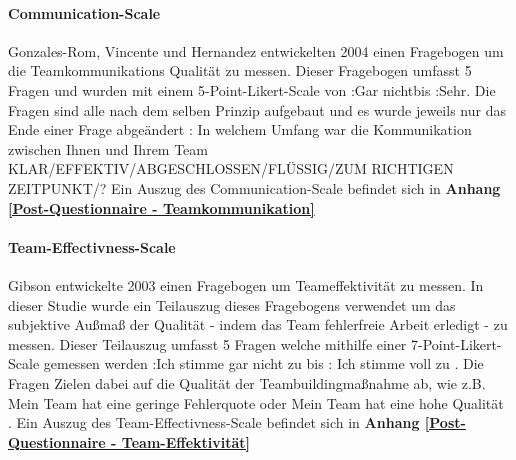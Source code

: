 \documentclass[a4paper,11pt]{article}%
\renewcommand{\\}{\vspace*{0.5\baselineskip} \newline}
\begin{document}
		\paragraph{Communication-Scale}
Gonzales-Rom, Vincente und Hernandez \citep[p.1049]{gonzalez2014climate}entwickelten 2004 einen Fragebogen um die Teamkommunikations Qualität zu messen. Dieser Fragebogen umfasst 5 Fragen und wurden mit einem 5-Point-Likert-Scale von :Gar nicht\frqq bis :Sehr\frqq. Die Fragen sind alle nach dem selben Prinzip aufgebaut und es wurde jeweils nur das Ende einer Frage abgeändert : \flqq In welchem Umfang war die Kommunikation zwischen Ihnen und Ihrem Team KLAR/EFFEKTIV/ABGESCHLOSSEN/FLÜSSIG/ZUM RICHTIGEN ZEITPUNKT/?\frqq 
\\Ein Auszug des Communication-Scale befindet sich in \textbf{Anhang \ref{Post-Questionnaire - Teamkommunikation}}

		\paragraph{Team-Effectivness-Scale}
Gibson \citep[p.469]{gibson2003team} entwickelte 2003 einen Fragebogen um Teameffektivität zu messen. In dieser Studie wurde ein Teilauszug dieses Fragebogens verwendet um das subjektive Außmaß der Qualität - indem das Team fehlerfreie Arbeit erledigt - zu messen. Dieser Teilauszug umfasst 5 Fragen welche mithilfe einer 7-Point-Likert-Scale gemessen werden :Ich stimme gar nicht zu \frqq bis : Ich stimme voll zu \frqq. Die Fragen Zielen dabei auf die Qualität der Teambuildingmaßnahme ab, wie z.B. \flqq Mein Team hat eine geringe Fehlerquote \frqq oder \flqq Mein Team hat eine hohe Qualität \frqq. 
\\Ein Auszug des Team-Effectivness-Scale befindet sich in \textbf{Anhang \ref{Post-Questionnaire - Team-Effektivität}}

\end{document}
